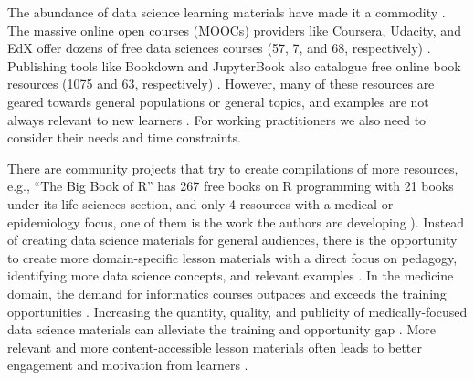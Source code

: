 \documentclass[020-persona\_validation.tex]{subfiles}
\begin{document}
    The abundance of data science learning materials have made it a commodity
    \cite{krossDemocratizationDataScience2020}.
    The massive online open courses (MOOCs) providers like
    Coursera,
    Udacity, and
    EdX
    offer dozens of free data sciences courses
    (57, 7, and 68, respectively)
    \cite{courseraTopFreeCourses, udacityDataScienceOnline, edxDataAnalysisCourses}.
    Publishing tools like Bookdown and
    JupyterBook
    also catalogue free online book resources
    (1075 and 63, respectively)
    \cite{bookdownAllBooksBookdown, executablebookprojectGalleryJupyterBooks}.
    However, many of these resources are geared towards general populations or general topics,
    and examples are not always relevant to new learners
    \cite{krossDemocratizationDataScience2020}.
    For working practitioners we also need to consider their needs and time constraints.

    There are community projects that try to create compilations of more resources,
    e.g., ``The Big Book of R'' has 267 free books on R programming with
    21 books under its life sciences section, and
    only 4 resources with a medical or epidemiology focus,
    one of them is the work the authors are developing \cite{baruffaBigBook2021}).
    Instead of creating data science materials for general audiences,
    there is the opportunity to create more domain-specific lesson materials
    with a direct focus on pedagogy,
    identifying more data science concepts,
    and relevant examples
    \cite{krossDemocratizationDataScience2020}.
    In the medicine domain, the demand for informatics courses outpaces and exceeds the training opportunities
    \cite{banerjeeMedicalStudentAwareness2015, americanmedicalassociationStudentInterestInformatics, americanmedicalassociationAcceleratingChangeMedical2021, americanmedicalassociationEducation}.
    Increasing the quantity, quality, and publicity of medically-focused
    data science materials can alleviate the training and opportunity gap
    \cite{banerjeeMedicalStudentAwareness2015, americanmedicalassociationAcceleratingChangeMedical2021}.
    More relevant and more content-accessible lesson materials often leads to better engagement and motivation from learners
    \cite{wilson2019teaching, ambrose2010learning, Koch2016}.


\end{document}
